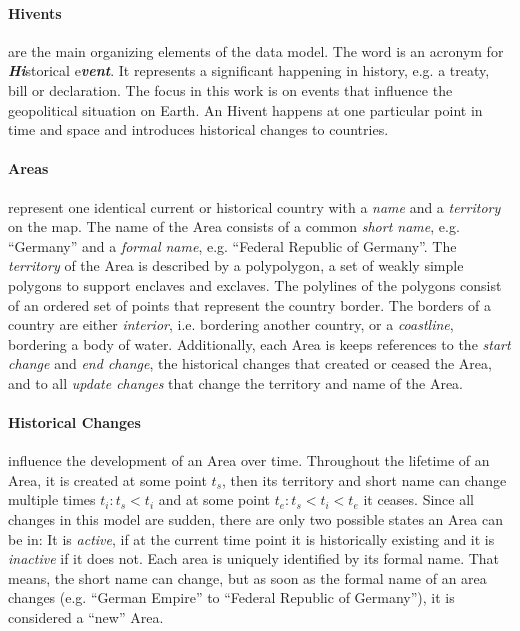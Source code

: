 \paragraph{Hivents} %
\label{par:hivent}

are the main organizing elements of the data model. The word is an acronym for \emph{\textbf{Hi}}storical e\emph{\textbf{vent}}. It represents a significant happening in history, e.g. a treaty, bill or declaration. The focus in this work is on events that influence the geopolitical situation on Earth. An Hivent happens at one particular point in time and space and introduces historical changes to countries.


\vspace{-1em}
\paragraph{Areas} %
\label{par:area}

represent one identical current or historical country with a \emph{name} and a \emph{territory} on the map. The name of the Area consists of a common \emph{short name}, e.g. ``Germany'' and a \emph{formal name}, e.g. ``Federal Republic of Germany''. The \emph{territory} of the Area is described by a polypolygon, a set of weakly simple polygons to support enclaves and exclaves. The polylines of the polygons consist of an ordered set of points that represent the country border. The borders of a country are either \emph{interior}, i.e. bordering another country, or a \emph{coastline}, bordering a body of water. Additionally, each Area is keeps references to the \emph{start change} and \emph{end change}, the historical changes that created or ceased the Area, and to all \emph{update changes} that change the territory and name of the Area.


\vspace{-1em}
\paragraph{Historical Changes} %
\label{par:historical_changes}

influence the development of an Area over time. Throughout the lifetime of an Area, it is created at some point $t_s$, then its territory and short name can change multiple times $t_i: t_s < t_i$ and at some point $t_e: t_s < t_i < t_e$ it ceases. Since all changes in this model are sudden, there are only two possible states an Area can be in: It is \emph{active}, if at the current time point it is historically existing and it is \emph{inactive} if it does not. Each area is uniquely identified by its formal name. That means, the short name can change, but as soon as the formal name of an area changes (e.g. ``German Empire'' to ``Federal Republic of Germany''), it is considered a ``new'' Area.

